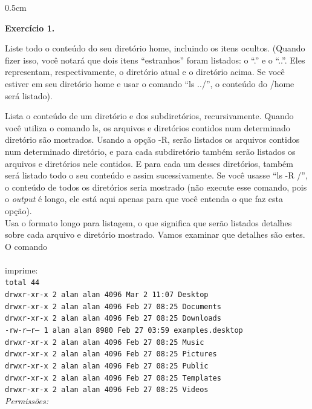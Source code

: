 \begin{refsection}
\begin {myindentpar}{0.5cm}
\begin{enumerate}[\itshape i.]
\begin{blackBlock}{\textbf{Exercício 1.}}\label{tut1:ex:1.\arabic{ex}}

Liste todo o conteúdo do seu diretório home, incluindo os itens ocultos. (Quando fizer isso, você notará que dois itens ``estranhos'' foram listados: o ``.'' e o ``..''. Eles representam, respectivamente, o diretório atual e o diretório acima. Se você estiver em seu diretório home e usar o comando ``ls ../'', o conteúdo do /home será listado).\\

\end{blackBlock}


         Lista o conteúdo de um diretório e dos subdiretórios, recursivamente. Quando você utiliza o comando ls, os arquivos e diretórios contidos num determinado diretório são mostrados. Usando a opção -R, serão listados os arquivos contidos num determinado diretório, e para cada subdiretório também serão listados os arquivos e diretórios nele contidos. E para cada um desses diretórios, também será listado todo o seu conteúdo e assim sucessivamente. Se você usasse ``ls -R /'', o conteúdo de todos os diretórios seria mostrado (não execute esse comando, pois o \textit{output} é longo, ele está aqui apenas para que você entenda o que faz esta opção).\\
          Usa o formato longo para listagem, o que significa que serão listados detalhes sobre cada arquivo e diretório mostrado. Vamos examinar que detalhes são estes. O comando \\
 \\
imprime:
\\
\indent\indent\texttt{total 44\\
drwxr-xr-x 2 alan alan 4096 Mar  2 11:07 Desktop\\
drwxr-xr-x 2 alan alan 4096 Feb 27 08:25 Documents\\
drwxr-xr-x 2 alan alan 4096 Feb 27 08:25 Downloads\\
-rw-r--r-- 1 alan alan 8980 Feb 27 03:59 examples.desktop\\
drwxr-xr-x 2 alan alan 4096 Feb 27 08:25 Music\\
drwxr-xr-x 2 alan alan 4096 Feb 27 08:25 Pictures\\
drwxr-xr-x 2 alan alan 4096 Feb 27 08:25 Public\\
drwxr-xr-x 2 alan alan 4096 Feb 27 08:25 Templates\\
drwxr-xr-x 2 alan alan 4096 Feb 27 08:25 Videos}\\
 \textit{Permissões:}


\end{enumerate}
\end{myindentpar}
\end{refsection}
